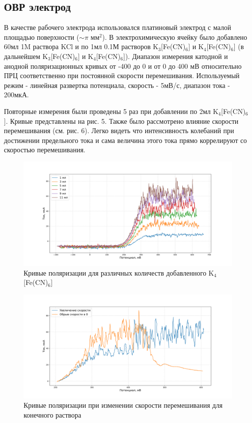 \documentclass[a4paper, 12pt]{article}
\begin{document}
\subsection{ОВР электрод}

В качестве рабочего электрода использовался платиновый электрод с малой площадью поверхности ($\sim \pi$ мм$^2$). В электрохимическую ячейку было добавлено 60мл 1M раствора KCl и по 1мл 0.1М растворов K$_3$[Fe(CN)$_6$] и K$_4$[Fe(CN)$_6$] (в дальнейшем K$_3$[Fe(CN)$_6$] и K$_4$[Fe(CN)$_6$]). Диапазон измерения катодной и анодной поляризационных кривых от -400 до 0 и от 0 до 400 мВ относительно ПРЦ соответственно при постоянной скорости перемешивания. Используемый режим - линейная развертка потенциала, скорость -  5мВ/с, диапазон тока - 200мкА.

Повторные измерения были проведены 5 раз при добавлении по 2мл K$_4$[Fe(CN)$_6$]. Кривые представлены на рис. 5. Также было рассмотрено влияние скорости перемешивания (см. рис. 6). Легко видеть что интенсивность колебаний при достижении предельного тока и сама величина этого тока прямо коррелируют со скоростью перемешивания. 

\begin{figure}[h!]
    \begin{center}
    \includegraphics[width=1\textwidth]{curves.png}
    \end{center}
    \caption{Кривые поляризации для различных количеств добавленного K$_4$[Fe(CN)$_6$]}
\end{figure} %

\begin{figure}[h!]
    \begin{center}
    \includegraphics[width=1\textwidth]{обрыв.png}
    \end{center}
    \caption{Кривые поляризации при изменении скорости перемешивания для конечного раствора}
\end{figure} %
\end{document}

